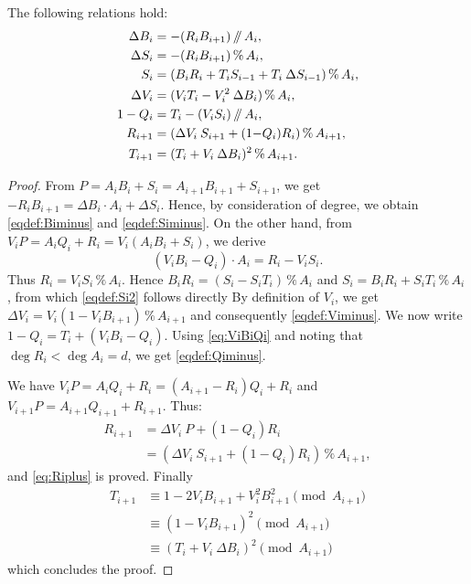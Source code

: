 \documentclass{sig-alternate-2013}
\renewcommand{\mod}{\,\%\,}
\renewcommand{\div}{\,/\hspace{-0.3em}/\,}
\def\todo#1{\ \!\!{\color{red} #1}}
\begin{document}
\begin{lem} \label{lem:formulae}
The following relations hold:
\begin{align}
\Delta B_i &= -(R_i B_{i+1}) \div A_i, \label{eqdef:Biminus} \\
\Delta S_i &= -(R_i B_{i+1}) \mod A_i,  \label{eqdef:Siminus} \\
S_{i} &= (B_i R_i + T_i S_{i-1} + T_i \: \Delta S_{i-1}) \mod A_{i}, \label{eqdef:Si2}  \\
\Delta V_i &= (V_i T_i - V_i^2 \: \Delta B_i) \mod A_{i}, \label{eqdef:Viminus}\\
1-Q_i &= T_i - (V_i S_i) \div A_i, \label{eqdef:Qiminus}\\
R_{i+1} &= (\Delta V_i \: S_{i+1}+(1{-}Q_i)R_i) \mod A_{i+1}, \label{eq:Riplus}\\
T_{i+1} &= (T_i + V_i \: \Delta B_i)^2 \mod{A_{i+1}}. \label{eq:ViBiplus}
\end{align}
\end{lem}

\begin{proof}
From $P= A_i B_i + S_i= A_{i+1} B_{i+1} + S_{i+1}$, we get
$- R_i B_{i+1}= \Delta B_i \cdot A_i + \Delta S_i$.
Hence, by consideration of degree, we obtain \eqref{eqdef:Biminus} 
and \eqref{eqdef:Siminus}.
On the other hand, from $V_i P = A_i Q_i + R_i=V_i (A_i B_i + S_i)$, we 
derive
\begin{equation}
\label{eq:ViBiQi} 
(V_i B_i -Q_i) \cdot A_i=R_i-V_i S_i. 
\end{equation} 
Thus $R_i=V_i S_i \mod A_i$.
Hence $B_i R_i = (S_i - S_i T_i) \mod A_i$ and $S_i = B_i R_i + S_i T_i 
\mod A_i$, from which \eqref{eqdef:Si2} follows directly 
By definition of $V_i$, we get $\Delta V_i = V_i (1-V_i B_{i+1}) \mod A_{i+1}$ and consequently \eqref{eqdef:Viminus}.
We now write $1-Q_i= T_i + (V_i B_i - Q_i)$. Using \eqref{eq:ViBiQi} and
noting that $\deg R_i < \deg A_i = d$, we 
get \eqref{eqdef:Qiminus}.

We have $V_i P=A_i Q_i+R_i=(A_{i+1}-R_i)Q_i+R_i$ and $V_{i+1} P=A_{i+1} 
Q_{i+1}+R_{i+1}$. Thus:
\begin{align*}
R_{i+1} &= \Delta V_i \: P + (1-Q_i)R_i \\
 &= (\Delta V_i \: S_{i+1} + (1-Q_i)R_i) \mod A_{i+1},
\end{align*} 
and \eqref{eq:Riplus} is proved. Finally
\begin{align*}
T_{i+1} &\equiv 1-2V_i B_{i+1}+V_i^2 B_{i+1}^2 \pmod {A_{i+1}} \\
&\equiv (1-V_i B_{i+1})^2 \pmod {A_{i+1}} \\
&\equiv (T_i + V_i \: \Delta B_i)^2 \pmod {A_{i+1}}
\end{align*}
which concludes the proof.
\end{proof}
\end{document}
